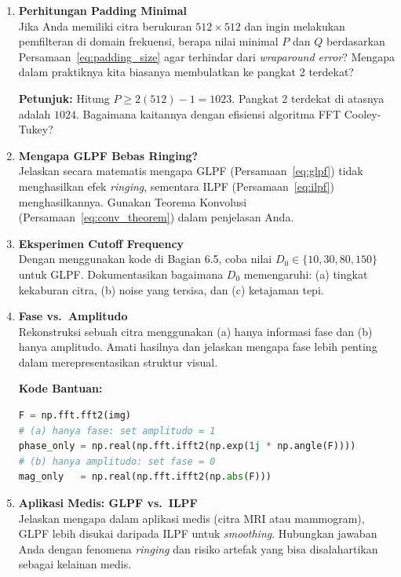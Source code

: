 \documentclass[12pt,a4paper]{article}
\begin{document}
\begin{enumerate}[leftmargin=*, label=\textbf{Latihan \arabic*.}]

  \item \textbf{Perhitungan Padding Minimal} \\
  Jika Anda memiliki citra berukuran $512 \times 512$ dan ingin melakukan pemfilteran
  di domain frekuensi, berapa nilai minimal $P$ dan $Q$ berdasarkan
  Persamaan~\eqref{eq:padding_size} agar terhindar dari \textit{wraparound error}?
  Mengapa dalam praktiknya kita biasanya membulatkan ke pangkat 2 terdekat?

  \begin{tipbox}
  \textbf{Petunjuk:} Hitung $P \geq 2(512) - 1 = 1023$. Pangkat 2 terdekat
  di atasnya adalah $1024$. Bagaimana kaitannya dengan efisiensi algoritma
  FFT Cooley-Tukey?
  \end{tipbox}

  \item \textbf{Mengapa GLPF Bebas Ringing?} \\
  Jelaskan secara matematis mengapa GLPF (Persamaan~\eqref{eq:glpf}) tidak
  menghasilkan efek \textit{ringing}, sementara ILPF (Persamaan~\eqref{eq:ilpf})
  menghasilkannya. Gunakan Teorema Konvolusi (Persamaan~\eqref{eq:conv_theorem})
  dalam penjelasan Anda.

  \item \textbf{Eksperimen Cutoff Frequency} \\
  Dengan menggunakan kode di Bagian 6.5, coba nilai $D_0 \in \{10, 30, 80, 150\}$
  untuk GLPF. Dokumentasikan bagaimana $D_0$ memengaruhi: (a) tingkat kekaburan
  citra, (b) noise yang tersisa, dan (c) ketajaman tepi.

  \item \textbf{Fase vs.\ Amplitudo} \\
  Rekonstruksi sebuah citra menggunakan (a) hanya informasi fase dan (b) hanya
  amplitudo. Amati hasilnya dan jelaskan mengapa fase lebih penting dalam
  merepresentasikan struktur visual.

  \begin{tipbox}
  \textbf{Kode Bantuan:}
  \begin{lstlisting}[language=Python]
F = np.fft.fft2(img)
# (a) hanya fase: set amplitudo = 1
phase_only = np.real(np.fft.ifft2(np.exp(1j * np.angle(F))))
# (b) hanya amplitudo: set fase = 0
mag_only   = np.real(np.fft.ifft2(np.abs(F)))
  \end{lstlisting}
  \end{tipbox}

  \item \textbf{Aplikasi Medis: GLPF vs.\ ILPF} \\
  Jelaskan mengapa dalam aplikasi medis (citra MRI atau mammogram), GLPF
  lebih disukai daripada ILPF untuk \textit{smoothing}. Hubungkan jawaban
  Anda dengan fenomena \textit{ringing} dan risiko artefak yang bisa
  disalahartikan sebagai kelainan medis.

\end{enumerate}
\end{document}
